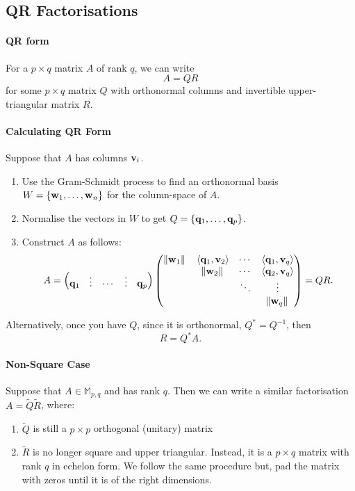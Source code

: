 \subsection{QR Factorisations}

\paragraph{QR form}
For a \( p\times q \) matrix \( A \) of rank \( q \), we can write \[
    A = QR
\]
for some \( p\times q \) matrix \( Q \) with orthonormal columns
and invertible upper-triangular matrix \( R \).

\paragraph{Calculating QR Form}
Suppose that \( A \) has columns \( \mathbf{v}_i \).
\begin{enumerate}
    \item Use the Gram-Schmidt process to find an orthonormal basis
        \( W = \left\{ \mathbf{w}_1, \dots, \mathbf{w}_n  \right\}\) for the column-space of \( A \).
    \item Normalise the vectors in \( W \) to get \( Q = \left\{ \mathbf{q}_1, \dots, \mathbf{q}_p \right\} \).
    \item Construct \( A \) as follows: \[
        A = \begin{pmatrix}
            \mathbf{q}_1 & \vdots & \cdots & \vdots & \mathbf{q}_p
        \end{pmatrix}
        \begin{pmatrix}
            \norm*{\mathbf{w}_1}   & \langle \mathbf{q}_1, \mathbf{v}_2 \rangle  & \cdots & \langle \mathbf{q}_1, \mathbf{v}_q \rangle \\
                            & \norm*{\mathbf{w}_2}             & \cdots & \langle \mathbf{q}_2, \mathbf{v}_q \rangle \\
                            &                           & \ddots & \vdots                   \\
                            &                           &        & \norm*{\mathbf{w}_q}            \\
        \end{pmatrix}
        = QR
    .\]
\end{enumerate}

Alternatively, once you have \( Q \), since it is orthonormal, \( Q^* = Q^{-1} \),
then \[
    R = Q^* A.
\]

\paragraph{Non-Square Case}
Suppose that \( A \in \mathbb{M}_{p, q} \) and has rank \( q \).
Then we can write a similar factorisation \( A = \widetilde{Q} \widetilde{R} \),
where:
\begin{enumerate}
    \item \( \widetilde{Q} \) is still a \( p\times p \) orthogonal (unitary) matrix
    \item \( \widetilde{R} \) is no longer square and upper triangular.
        Instead, it is a \( p\times q \) matrix with rank \( q \) in echelon form.
        We follow the same procedure but, pad the matrix with zeros until it
        is of the right dimensions.
\end{enumerate}

